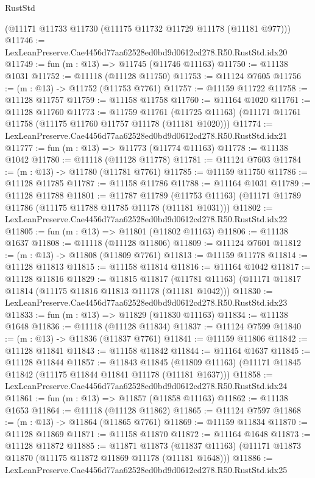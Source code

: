 \begin{lexlean}{RustStd}
\begin{coremodule}
    (@11171 @11733 @11730 (@11175 @11732 @11729 @11178 (@11181 @977)))
@11746 := LexLeanPreserve.Cae4456d77aa62528ed0bd9d0612cd278.R50.RustStd.idx20
@11749 := fun (m : @13) => @11745 (@11746 @11163)
@11750 := @11138 @1031
@11752 := @11118 (@11128 @11750)
@11753 := @11124 @7605
@11756 := (m : @13) -> @11752 (@11753 @7761)
@11757 := @11159 @11722
@11758 := @11128 @11757
@11759 := @11158 @11758
@11760 := @11164 @1020
@11761 := @11128 @11760
@11773 := @11759
    @11761
    (@11725 @11163)
    (@11171 @11761 @11758 (@11175 @11760 @11757 @11178 (@11181 @1020)))
@11774 := LexLeanPreserve.Cae4456d77aa62528ed0bd9d0612cd278.R50.RustStd.idx21
@11777 := fun (m : @13) => @11773 (@11774 @11163)
@11778 := @11138 @1042
@11780 := @11118 (@11128 @11778)
@11781 := @11124 @7603
@11784 := (m : @13) -> @11780 (@11781 @7761)
@11785 := @11159 @11750
@11786 := @11128 @11785
@11787 := @11158 @11786
@11788 := @11164 @1031
@11789 := @11128 @11788
@11801 := @11787
    @11789
    (@11753 @11163)
    (@11171 @11789 @11786 (@11175 @11788 @11785 @11178 (@11181 @1031)))
@11802 := LexLeanPreserve.Cae4456d77aa62528ed0bd9d0612cd278.R50.RustStd.idx22
@11805 := fun (m : @13) => @11801 (@11802 @11163)
@11806 := @11138 @1637
@11808 := @11118 (@11128 @11806)
@11809 := @11124 @7601
@11812 := (m : @13) -> @11808 (@11809 @7761)
@11813 := @11159 @11778
@11814 := @11128 @11813
@11815 := @11158 @11814
@11816 := @11164 @1042
@11817 := @11128 @11816
@11829 := @11815
    @11817
    (@11781 @11163)
    (@11171 @11817 @11814 (@11175 @11816 @11813 @11178 (@11181 @1042)))
@11830 := LexLeanPreserve.Cae4456d77aa62528ed0bd9d0612cd278.R50.RustStd.idx23
@11833 := fun (m : @13) => @11829 (@11830 @11163)
@11834 := @11138 @1648
@11836 := @11118 (@11128 @11834)
@11837 := @11124 @7599
@11840 := (m : @13) -> @11836 (@11837 @7761)
@11841 := @11159 @11806
@11842 := @11128 @11841
@11843 := @11158 @11842
@11844 := @11164 @1637
@11845 := @11128 @11844
@11857 := @11843
    @11845
    (@11809 @11163)
    (@11171 @11845 @11842 (@11175 @11844 @11841 @11178 (@11181 @1637)))
@11858 := LexLeanPreserve.Cae4456d77aa62528ed0bd9d0612cd278.R50.RustStd.idx24
@11861 := fun (m : @13) => @11857 (@11858 @11163)
@11862 := @11138 @1653
@11864 := @11118 (@11128 @11862)
@11865 := @11124 @7597
@11868 := (m : @13) -> @11864 (@11865 @7761)
@11869 := @11159 @11834
@11870 := @11128 @11869
@11871 := @11158 @11870
@11872 := @11164 @1648
@11873 := @11128 @11872
@11885 := @11871
    @11873
    (@11837 @11163)
    (@11171 @11873 @11870 (@11175 @11872 @11869 @11178 (@11181 @1648)))
@11886 := LexLeanPreserve.Cae4456d77aa62528ed0bd9d0612cd278.R50.RustStd.idx25

\end{coremodule}
\end{lexlean}
